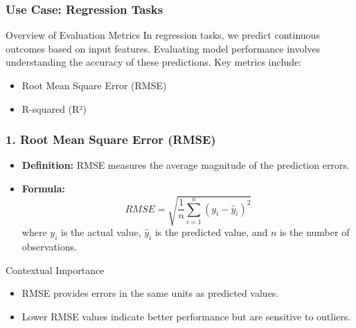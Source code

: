\documentclass[aspectratio=169]{beamer}
\begin{document}
\begin{frame}[fragile]
    \frametitle{Use Case: Regression Tasks}
    \begin{block}{Overview of Evaluation Metrics}
        In regression tasks, we predict continuous outcomes based on input features. Evaluating model performance involves understanding the accuracy of these predictions. Key metrics include:
        \begin{itemize}
            \item Root Mean Square Error (RMSE)
            \item R-squared (R²)
        \end{itemize}
    \end{block}
\end{frame}

\begin{frame}[fragile]
    \frametitle{1. Root Mean Square Error (RMSE)}
    \begin{itemize}
        \item \textbf{Definition:} RMSE measures the average magnitude of the prediction errors.
        \item \textbf{Formula:}
        \begin{equation}
            RMSE = \sqrt{\frac{1}{n} \sum_{i=1}^{n} (y_i - \hat{y}_i)^2}
        \end{equation}
        where \(y_i\) is the actual value, \(\hat{y}_i\) is the predicted value, and \(n\) is the number of observations.
    \end{itemize}
    
    \begin{block}{Contextual Importance}
        \begin{itemize}
            \item RMSE provides errors in the same units as predicted values.
            \item Lower RMSE values indicate better performance but are sensitive to outliers.
        \end{itemize}
    \end{block}
\end{frame}
\end{document}
